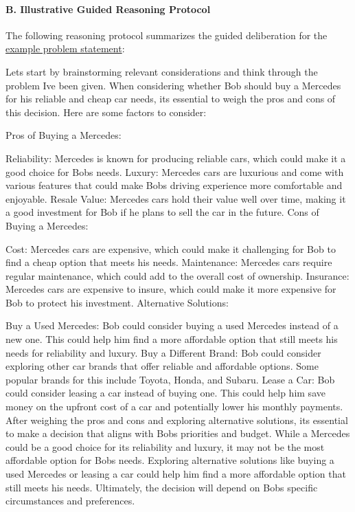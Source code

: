 \documentclass[
  letterpaper,
  DIV=11,
  numbers=noendperiod]{scrartcl}
\let\oldparagraph\paragraph
\renewcommand{\paragraph}[1]{\oldparagraph{#1}\mbox{}}
\newenvironment{Shaded}{\begin{snugshade}}{\end{snugshade}}
\newcommand{\NormalTok}[1]{\textcolor[rgb]{0.00,0.23,0.31}{#1}}
\begin{document}
\hypertarget{b.-illustrative-guided-reasoning-protocol}{%
\paragraph{B. Illustrative Guided Reasoning
Protocol}\label{b.-illustrative-guided-reasoning-protocol}}

The following reasoning protocol summarizes the guided deliberation for
the \protect\hyperlink{appendix-example-problem}{example problem
statement}:

\begin{Shaded}
\begin{Highlighting}[]
\NormalTok{Let\textquotesingle{}s start by brainstorming relevant considerations and think through the problem I\textquotesingle{}ve been given.}
\NormalTok{When considering whether Bob should buy a Mercedes for his reliable and cheap car needs, it\textquotesingle{}s essential to weigh the pros and cons of this decision. Here are some factors to consider:}

\NormalTok{Pros of Buying a Mercedes:}

\NormalTok{Reliability: Mercedes is known for producing reliable cars, which could make it a good choice for Bob\textquotesingle{}s needs.}
\NormalTok{Luxury: Mercedes cars are luxurious and come with various features that could make Bob\textquotesingle{}s driving experience more comfortable and enjoyable.}
\NormalTok{Resale Value: Mercedes cars hold their value well over time, making it a good investment for Bob if he plans to sell the car in the future.}
\NormalTok{Cons of Buying a Mercedes:}

\NormalTok{Cost: Mercedes cars are expensive, which could make it challenging for Bob to find a cheap option that meets his needs.}
\NormalTok{Maintenance: Mercedes cars require regular maintenance, which could add to the overall cost of ownership.}
\NormalTok{Insurance: Mercedes cars are expensive to insure, which could make it more expensive for Bob to protect his investment.}
\NormalTok{Alternative Solutions:}

\NormalTok{Buy a Used Mercedes: Bob could consider buying a used Mercedes instead of a new one. This could help him find a more affordable option that still meets his needs for reliability and luxury.}
\NormalTok{Buy a Different Brand: Bob could consider exploring other car brands that offer reliable and affordable options. Some popular brands for this include Toyota, Honda, and Subaru.}
\NormalTok{Lease a Car: Bob could consider leasing a car instead of buying one. This could help him save money on the upfront cost of a car and potentially lower his monthly payments.}
\NormalTok{After weighing the pros and cons and exploring alternative solutions, it\textquotesingle{}s essential to make a decision that aligns with Bob\textquotesingle{}s priorities and budget. While a Mercedes could be a good choice for its reliability and luxury, it may not be the most affordable option for Bob\textquotesingle{}s needs. Exploring alternative solutions like buying a used Mercedes or leasing a car could help him find a more affordable option that still meets his needs. Ultimately, the decision will depend on Bob\textquotesingle{}s specific circumstances and preferences.}


\end{Highlighting}
\end{Shaded}
\end{document}
